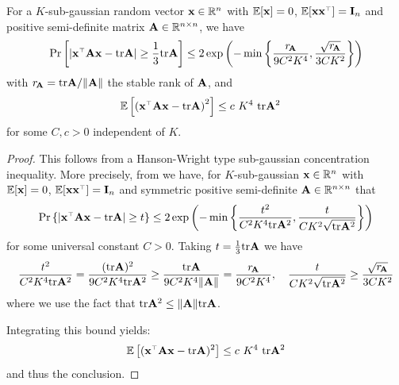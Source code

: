 \documentclass{article}
\begin{document}
%
%
%
\begin{lemma}
\label{l:concentration-sub-gaussian}
For a $K$-sub-gaussian random vector $\mathbf x \in \mathbb R^n$ with $\mathbb E[\mathbf x] = 0$, $\E[\x \x^\top] = \I_n$ and positive semi-definite matrix $\mathbf A \in \mathbb R^{n \times n}$, we have
\[
  \Pr\left[
    \lvert \x^\top \A \x - \tr \A \rvert
    \geq \frac13 \tr \A
    \right] \leq 2 \exp\left( - \min \left\{ \frac{r_{\!\A}}{9 C^2 K^4}, \frac{\sqrt{r_{\!\A}}}{3 C K^2}  \right\} \right)
\]
with $r_{\!\mathbf A} = \mathrm{tr} \mathbf A/\| \mathbf A \|$ the stable rank of $\mathbf A$, and 
\begin{align*}
  \E\left[ \left( \x^\top \A \x - \tr \A \right)^2 \right]
  &\leq c~K^4~\tr \A^2
\end{align*}
for some $C,c > 0$ independent of $K$.
\end{lemma}

\begin{proof}
This follows from a Hanson-Wright type \cite{rudelson2013hanson} sub-gaussian concentration inequality. More precisely,
from \cite[Corollary 2.9]{zajkowski2018bounds} we have, for $K$-sub-gaussian $\mathbf x \in \mathbb R^n$ with $\mathbb E[\mathbf x] = 0$, $\E[\x \x^\top] = \I_n$ and symmetric positive semi-definite $\mathbf A \in \mathbb R^{n \times n}$ that 
\[
  \Pr \left\{ \left| \x^\top \A \x - \tr \A  \right| \ge t \right\} \le 2 \exp \left( - \min \left\{ \frac{t^2}{C^2 K^4 \tr\A^2 },  \frac{t}{C K^2 \sqrt{\tr\A^2}  } \right\} \right)
\]
for some universal constant $C > 0$. Taking $t = \frac13 \mathrm{tr} \mathbf A$ we have
\[
  \frac{t^2}{C^2 K^4 \mathrm{tr}\mathbf A^2 } = \frac{ (\mathrm{tr} \mathbf A)^2 }{9 C^2 K^4 \mathrm{tr}\mathbf A^2 } \ge \frac{ \mathrm{tr} \mathbf A }{9 C^2 K^4 \| \mathbf A \| } = \frac{r_{\!\mathbf A}}{9 C^2 K^4}, \quad \frac{t}{C K^2 \sqrt{\mathrm{tr}\mathbf A^2}  } \ge \frac{\sqrt{r_{\!\mathbf A}}}{3 C K^2}
\]
where we use the fact that $\mathrm{tr} \mathbf A^2 \le \| \mathbf A \| \mathrm{tr} \mathbf A$.

Integrating this bound yields:
\[
  \E\left[ (\x^\top \A \x - \tr \A )^2 \right] \le c~K^4~\tr \A^2
\]
and thus the conclusion.
\end{proof}
\end{document}
